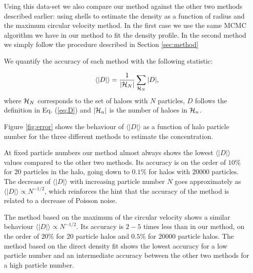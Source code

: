 \documentclass{emulateapj}
\newcommand{\avg}[1]{\langle{#1}\rangle}
\begin{document}
Using this data-set we also compare our method against the other two
methods described earlier: using shells to estimate the density as a
function of radius and the maximum circular velocity method.
In the first case we use the same MCMC algorithm we
have in our method to fit the density profile.
In the second method we simply follow the procedure described in
Section \ref{sec:method}

We quantify the accuracy of each method with the following statistic:

\begin{equation}
\avg{|D|}=\frac{1}{\left|{\cal{H}}_N\right|}\sum_{{\cal{H}}_N} |D|,
\end{equation}
%
where ${\cal{H}}_N$ corresponds to the set of haloes with $N$
particles, $D$ follows the definition in Eq. (\ref{eq:D}) and
$\left|{\cal{H}}_n\right|$ is the number of haloes in ${\cal{H}}_n$.


Figure \ref{fig:error} shows the behaviour of $\avg{|D|}$ as a function of
halo particle number for the three different methods to estimate the
concentration.

At fixed particle numbers our method almost always shows the lowest
$\avg{|D|}$ values compared to the other two methods.
Its accuracy is on the order of $10\%$ for $20$ particles in the halo,
going down to $0.1\%$ for halos with $20000$ particles.
The decrease of $\avg{|D|}$ with increasing particle number $N$ goes
approximately as $\avg{|D|}\propto N^{-1/2}$, which reinforces the hint that
the accuracy of the method is related to a decrease of Poisson
noise.

The method based on the maximum of the circular velocity shows a similar
behaviour $\avg{|D|}\propto N^{-1/2}$. Its accuracy is $2-5$ times less
than in our method, on the order of $20\%$ for $20$ particle halos and
$0.5\%$ for $20000$ particle halos. The method based on the direct density
fit shows the lowest accuracy for a low particle number and an intermediate
accuracy between the other two methods for a high particle number.
\end{document}
